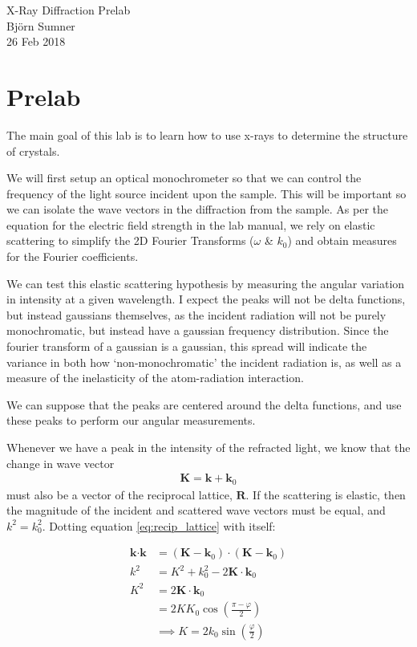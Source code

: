 \documentclass[12pt]{article}
\begin{document}
\begin{center}
{\Large X-Ray Diffraction Prelab} \\[.3in]
{\large Bj\"{o}rn Sumner} \\
{26 Feb 2018}
\end{center}

\section*{Prelab}


The main goal of this lab is to learn how to use x-rays to determine the structure of crystals.  

We will first setup an optical monochrometer so that we can control the frequency of the light source incident upon the sample.  This will be important so we can isolate the wave vectors in the diffraction from the sample.  As per the equation for the electric field strength in the lab manual, we rely on elastic scattering to simplify the 2D Fourier Transforms ($\omega$ \& $k_0$) and obtain measures for the Fourier coefficients.

We can test this elastic scattering hypothesis by measuring the angular variation in intensity at a given wavelength.  I expect the peaks will not be delta functions, but instead gaussians themselves, as the incident radiation will not be purely monochromatic, but instead have a gaussian frequency distribution.  Since the fourier transform of a gaussian is a gaussian, this spread will indicate the variance in both how `non-monochromatic' the incident radiation is, as well as a measure of the inelasticity of the atom-radiation interaction.

We can suppose that the peaks are centered around the delta functions, and use these peaks to perform our angular measurements.

Whenever we have a peak in the intensity of the refracted light, we know that the change in wave vector 
\begin{align}
	\textbf{K} = \textbf{k}+\textbf{k}_0 \label{eq:recip_lattice}
\end{align} must also be a vector of the reciprocal lattice, $\textbf{R}$\cite{AandM_SS}.  If the scattering is elastic, then the magnitude of the incident and scattered wave vectors must be equal, and $k^2 = k_0^2$. Dotting equation \ref{eq:recip_lattice} with itself:

\begin{align}
	\textbf{k}\cdot\textbf{k} &= \left(\textbf{K}-\textbf{k}_0\right)\cdot\left(\textbf{K}-\textbf{k}_0\right)\nonumber\\
	k^2 &= K^2 + k_0^2 - 2 \textbf{K} \cdot \textbf{k}_0 \nonumber\\
	K^2 &= 2 \textbf{K} \cdot \textbf{k}_0 \nonumber\\
	&= 2 K K_0 \cos(\frac{\pi - \varphi}{2}) \nonumber\\
	& \implies K = 2k_0 \sin(\frac{\varphi}{2}) \label{eq:scatter}
\end{align}
\end{document}
